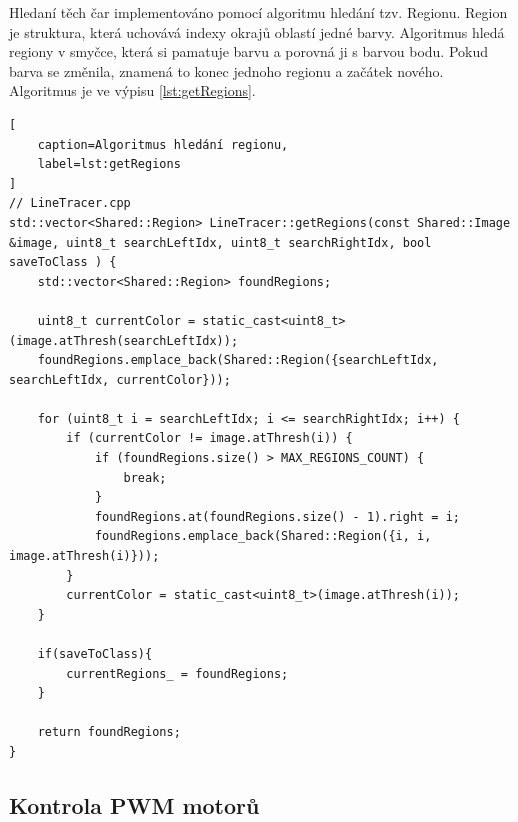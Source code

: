 Hledaní těch čar implementováno pomocí algoritmu hledání tzv. Regionu.
Region je struktura, která uchovává indexy okrajů oblastí jedné barvy.
Algoritmus hledá regiony v smyčce, která si pamatuje barvu a porovná ji s barvou bodu.
Pokud barva se změnila, znamená to konec jednoho regionu a začátek nového.
Algoritmus je ve výpisu \ref{lst:getRegions}\cite{robot}.
\begin{lstlisting}[
	caption=Algoritmus hledání regionu,
	label=lst:getRegions
]
// LineTracer.cpp
std::vector<Shared::Region> LineTracer::getRegions(const Shared::Image &image, uint8_t searchLeftIdx, uint8_t searchRightIdx, bool saveToClass ) {
	std::vector<Shared::Region> foundRegions;

	uint8_t currentColor = static_cast<uint8_t>(image.atThresh(searchLeftIdx));
	foundRegions.emplace_back(Shared::Region({searchLeftIdx, searchLeftIdx, currentColor}));

	for (uint8_t i = searchLeftIdx; i <= searchRightIdx; i++) {
		if (currentColor != image.atThresh(i)) {
			if (foundRegions.size() > MAX_REGIONS_COUNT) {
				break;
			}
			foundRegions.at(foundRegions.size() - 1).right = i;
			foundRegions.emplace_back(Shared::Region({i, i, image.atThresh(i)}));
		}
		currentColor = static_cast<uint8_t>(image.atThresh(i));
	}

	if(saveToClass){
		currentRegions_ = foundRegions;
	}

	return foundRegions;
}
\end{lstlisting}

\subsection{Kontrola PWM motorů}\

